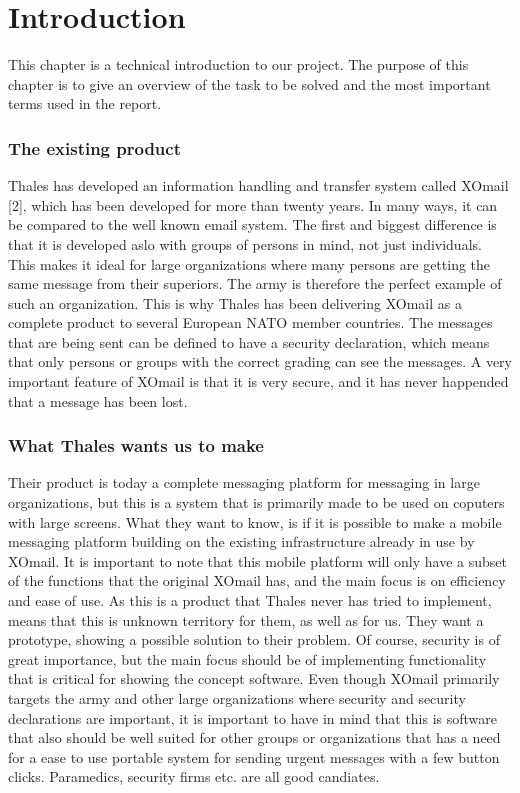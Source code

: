 \chapter{Introduction}


This chapter is a technical introduction to our project. The purpose of this chapter is to give an overview of the task to be solved and the most important terms used in the report.

\subsection*{The existing product}
Thales has developed an information handling and transfer system called XOmail [2], which has been developed for more than twenty years. In many ways, it can be compared to the well known email system. The first and biggest difference is that it is developed aslo with groups of persons in mind, not just individuals. This makes it ideal for large organizations where many persons are getting the same message from their superiors. The army is therefore the perfect example of such an organization. This is why Thales has been delivering XOmail as a complete product to several European NATO member countries. 
\newline
\newline
The messages that are being sent can be defined to have a security declaration, which means that only persons or groups with the correct grading can see the messages. A very important feature of XOmail is that it is very secure, and it has never happended that a message has been lost.

\newpage
\subsection*{What Thales wants us to make}
Their product is today a complete messaging platform for messaging in large organizations, but this is a system that is primarily made to be used on coputers with large screens. What they want to know, is if it is possible to make a mobile messaging platform building on the existing infrastructure already in use by XOmail. It is important to note that this mobile platform will only have a subset of the functions that the original XOmail has, and the main focus is on efficiency and ease of use. 
\newline
\newline
As this is a product that Thales never has tried to implement, means that this is unknown territory for them, as well as for us. They want a prototype, showing a possible solution to their problem. Of course, security is of great importance, but the main focus should be of implementing functionality that is critical for showing the concept software. 
\newline
\newline
Even though XOmail primarily targets the army and other large organizations where security and security declarations are important, it is important to have in mind that this is software that also should be well suited for other groups or organizations that has a need for a ease to use portable system for sending urgent messages with a few button clicks. Paramedics, security firms etc. are all good candiates. 

